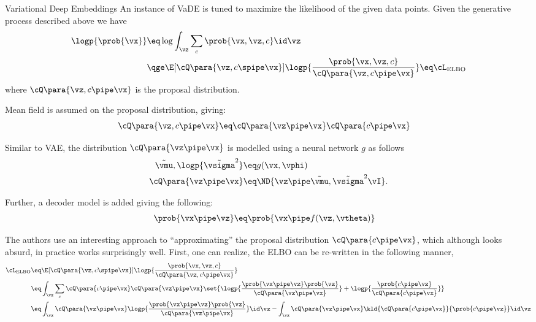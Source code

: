 \documentclass{article}
\begin{document}
\begin{psection}{Variational Deep Embeddings}
	An instance of VaDE is tuned to maximize the likelihood of the given data points. Given the generative process described above we have
	\begin{align*}
		\logp{\prob{\vx}} &\eq \log{\int_\vz \sum_c \prob{\vx, \vz, c} \id \vz} \\
		&\qge \E[\cQ\para{\vz, c \spipe \vx}]{\logp{\frac{\prob{\vx, \vz, c}}{\cQ\para{\vz, c \pipe \vx}}}} \eq \cL_{\text{ELBO}}
	\end{align*}
	where $\cQ\para{\vz, c \pipe \vx}$ is the proposal distribution.

	Mean field is assumed on the proposal distribution, giving:
	\begin{align*}
		\cQ\para{\vz, c \pipe \vx} &\eq \cQ\para{\vz \pipe \vx} \cQ\para{c \pipe \vx}
	\end{align*}

	Similar to VAE, the distribution $\cQ\para{\vz \pipe \vx}$ is modelled using a neural network $g$ as follows
	\begin{align*}
		\tilde{\vmu}, \logp{\tilde{\vsigma}^2} &\eq g(\vx, \vphi) \\
		\cQ\para{\vz \pipe \vx} &\eq \ND{\vz \pipe \tilde{\vmu}, \tilde{\vsigma}^2 \vI}.
	\end{align*}

	Further, a decoder model is added giving the following:
	\begin{align*}
		\prob{\vx \pipe \vz} &\eq \prob{\vx \pipe f(\vz, \vtheta)}
	\end{align*}

	The authors use an interesting approach to ``approximating'' the proposal distribution $\cQ\para{c \pipe \vx}$, which although looks absurd, in practice works surprisingly well. First, one can realize, the ELBO can be re-written in the following manner,
	\begin{align*}
		\cL_{\text{ELBO}} &\eq 	\E[\cQ\para{\vz, c \spipe \vx}]{\logp{\frac{\prob{\vx, \vz, c}}{\cQ\para{\vz, c \pipe \vx}}}} \\
		&\eq					\int_{\vz} \sum_{c} \cQ\para{c \pipe \vx} \cQ\para{\vz \pipe \vx} \set{\logp{\frac{\prob{\vx \pipe \vz} \prob{\vz}}{\cQ\para{\vz \pipe \vx}}} + \logp{\frac{\prob{c \pipe \vz}}{\cQ\para{c \pipe \vx}}}} \\
		&\eq \int_{\vz} \cQ\para{\vz \pipe \vx} \logp{\frac{\prob{\vx \pipe \vz} \prob{\vz}}{\cQ\para{\vz \pipe \vx}}} \id \vz - \int_{\vz} \cQ\para{\vz \pipe \vx} \kld{\cQ\para{c \pipe \vx}}{\prob{c \pipe \vz}} \id \vz
	\end{align*}


\end{psection}
\end{document}
